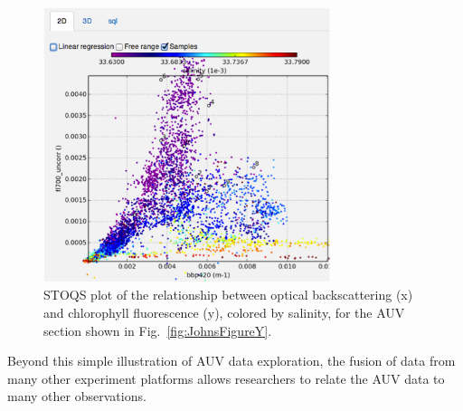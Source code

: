 \begin{figure}[htbp]
\centering
\includegraphics[width=3.3in]{JohnsFigureZ.png}
\caption{STOQS plot of the relationship between optical backscattering (x) and chlorophyll fluorescence (y), colored by salinity, for the AUV section shown in Fig.~\ref{fig:JohnsFigureY}.}
\label{fig:JohnsFigureZ}
\end{figure}

Beyond this simple illustration of AUV data exploration, the fusion of data from many other experiment platforms allows researchers to relate the AUV data to many other observations.

